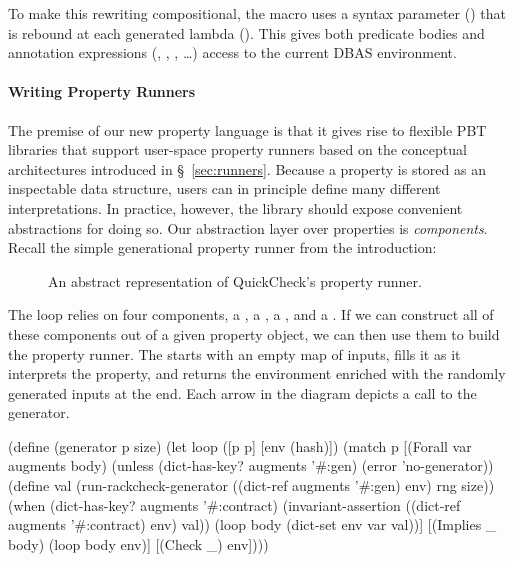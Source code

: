 To make this rewriting compositional, the macro uses a syntax parameter
() that is rebound at each generated lambda (). This gives both predicate bodies and annotation expressions (,
, , \ldots) access to the current DBAS environment.

\paragraph*{Writing Property Runners}

The premise of our new property language is that it gives rise to flexible PBT
libraries that support user-space property runners based on the conceptual
architectures introduced in \S~\ref{sec:runners}. Because a property is stored as an
inspectable data structure, users can in principle define many different
interpretations. In practice, however, the library should expose convenient
abstractions for doing so. Our abstraction layer over properties is \emph{components}.
Recall the simple generational property runner from the introduction:

\begin{figure}[h]
  \centering
  \resizebox{0.95\linewidth}{!}{}
  \caption{An abstract representation of QuickCheck's property runner.}
\end{figure}

The loop relies on four components, a \generator{}, a \checker{}, a \shrinker{}, and a
\printer{}. If we can construct all of these components out of a given property object,
we can then use them to build the property runner. The \generator{} starts with an
empty map of inputs, fills it as it interprets the property, and returns the
environment enriched with the randomly generated inputs at the end. Each
 arrow in the diagram depicts a call to the generator.

\begin{code}[language=Racket]
(define (generator p size)
  (let loop ([p p]
             [env (hash)])
    (match p
      [(Forall var augments body)
       (unless (dict-has-key? augments '#:gen)
         (error 'no-generator))
       (define val
         (run-rackcheck-generator
          ((dict-ref augments '#:gen) env)
          rng
          size))
       (when (dict-has-key? augments '#:contract)
         (invariant-assertion ((dict-ref augments '#:contract) env) val))
       (loop body (dict-set env var val))]
      [(Implies _ body)
       (loop body env)]
      [(Check _) env])))
\end{code}

